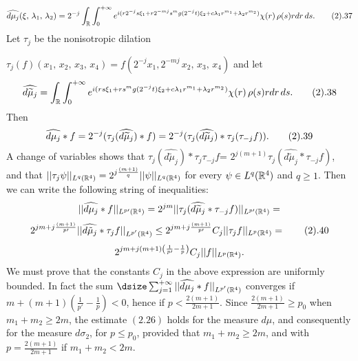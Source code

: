 $$
\widehat{d\mu_j }(\xi,\,\lambda_1,\,\lambda_2)  =
2^{-j}\int_{{\Bbb R}}\int_0^{+\infty}
e^{i(r2^{-j}s\xi_1 + r2^{-mj}s^mg(2^{-j}t)\xi_2 +
c\lambda_1 r^{m_1}  +\lambda_2 r^{m_2})}
\chi(r)\,\rho(s)rdr\,ds.
\tag 2.37
$$ 
Let $\tau_j$ be the nonisotropic dilation
\par\noindent
$\tau_j(f)(x_1,\,x_2,\,x_3,\,x_4) 
= f(2^{-j}x_1, 2^{-mj}\,x_2,\,x_3,\,x_4)$ and let 
$$
\widehat{d\widetilde\mu_j }  =
\int_{{\Bbb R}}\int_0^{+\infty}
e^{i(rs\xi_1 + rs^mg(2^{-j}t)\xi_2 +c\lambda_1 r^{m_1}  +\lambda_2 r^{m_2})}
\chi(r)\,\rho(s)rdr\,ds.
\tag 2.38
$$ 
Then 
$$
\widehat{d\mu_j}*f = 2^{-j}(\tau_{j}(\widehat{d\widetilde\mu_j})*f)
=2^{-j}(\tau_{j}(\widehat{d\widetilde\mu_j})*\tau_{j}(\tau_{-j}f)).
\tag 2.39
$$
A change of variables shows that 
$\tau_{j}(\widehat{d\widetilde\mu_j})*\tau_{j}\tau_{-j}f$=
$ 2^{j(m+1)}\tau_{j}(\widehat{d\widetilde\mu_j}* \tau_{-j}f)$, and that
\newline $||\tau_j\psi||_{L^{q}({\Bbb R}^4)} =
2^{j\frac{(m+1)}{q}} ||\psi||_{L^{q}({\Bbb R}^4)}$ for every 
$\psi \in L^{q}({\Bbb R}^4)$ and $q\ge 1$. 
Then we can write the following string of inequalities:
$$
||\widehat{d\mu_j}*f||_{L^{p\prime}({\Bbb R}^4)} = 
2^{jm}||\tau_{j}(\widehat{d\widetilde\mu_j}* \tau_{-j}f)||_{L^{p\prime}
({\Bbb R}^4)}
=$$
$$
2^{jm +j\frac{(m+1)}{p\prime}}||  
\widehat{d\tilde\mu_j}* \tau_{j}f||_{L^{p'}({\Bbb R}^4)}
\leq 2^{jm +j\frac{(m+1)}{p\prime}}C_j||\tau_{j}f||_{L^{p}({\Bbb R}^4)} =
\tag 2.40
$$
$$
2^{jm +j(m+1)\left(\frac{1}{p\prime}-\frac{1}{p}\right)}
C_j||f||_{L^{p}({\Bbb R}^4)}.
$$
We must prove that the constants $C_j$ in the above expression are uniformly 
bounded. In fact the sum 
$\dsize 
\sum_{j=1}^{+\infty}||\widehat{d\mu_j}*f||_{L^{p'}({\Bbb R}^4)}$
converges if 
$ m+(m+1)\left(\frac{1}{p'}-\frac{1}{p}\right)<0$, hence if 
$ p< \frac{2(m+1)}{2m+1}$. 
Since $\frac{2(m+1)}{2m+1} \ge p_0$ when $m_1+m_2\ge 2m$, the 
estimate $(2.26)$ holds for the measure $d\mu$, and 
consequently for the measure $d\sigma_2$,  
for $p\leq p_0$, provided  that $m_1+m_2 \ge 2m$, and with 
$p=\frac{2(m+1)}{2m+1}$ if $m_1+m_2<2m$.

